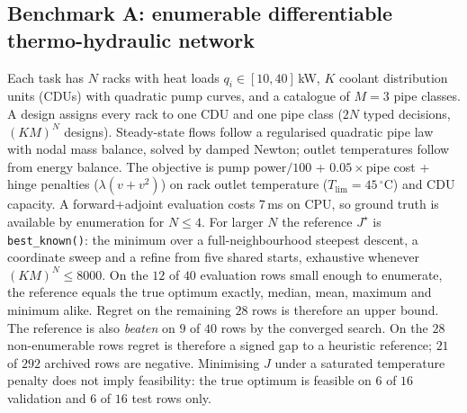 \documentclass[journal]{IEEEtran}
\newcommand{\Jobj}{J}
\begin{document}
\subsection{Benchmark A: enumerable differentiable thermo-hydraulic network}
\label{sec:benchA}
Each task has $N$ racks with heat loads $q_i\in[10,40]$\,kW, $K$ coolant
distribution units (CDUs) with quadratic pump curves, and a catalogue of $M=3$
pipe classes.  A design assigns every rack to one CDU and one pipe class ($2N$
typed decisions, $(KM)^N$ designs).  Steady-state flows follow a regularised
quadratic pipe law with nodal mass balance, solved by damped Newton; outlet
temperatures follow from energy balance.  The objective is pump power$/100$ +
$0.05\times$pipe cost + hinge penalties ($\lambda(v+v^2)$) on rack outlet
temperature ($T_{\lim}=45$\,$^\circ$C) and CDU capacity.  A forward+adjoint
evaluation costs 7\,ms on CPU, so ground truth is available by enumeration for
$N\le4$.  For larger $N$ the reference $\Jobj^\star$ is \texttt{best\_known()}:
the minimum over a full-neighbourhood steepest descent, a coordinate sweep and a
refine from five shared starts, exhaustive whenever $(KM)^N\le8000$.  On the $12$
of $40$ evaluation rows small enough to enumerate, the reference equals the true
optimum exactly, median, mean, maximum and minimum alike.  Regret on the
remaining $28$ rows is therefore an upper bound.  The reference is also \emph{beaten} on $9$ of $40$ rows by the converged search.  On
the $28$ non-enumerable rows regret is therefore a signed gap to a heuristic
reference; $21$ of $292$ archived rows are negative.
Minimising $\Jobj$ under a saturated temperature penalty does not imply feasibility: the true optimum is
feasible on $6$ of $16$ validation and $6$ of $16$ test rows only.
\end{document}
